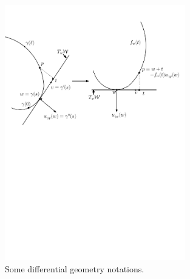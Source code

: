 \documentclass[english]{article}
\begin{document}
\begin{figure}[th]
	\centering
	\includegraphics[width=0.7\textwidth]{figures/DiffGeo}
	\caption{Some differential geometry notations. \label{fig:diffgeo}}
\end{figure}
\end{document}
